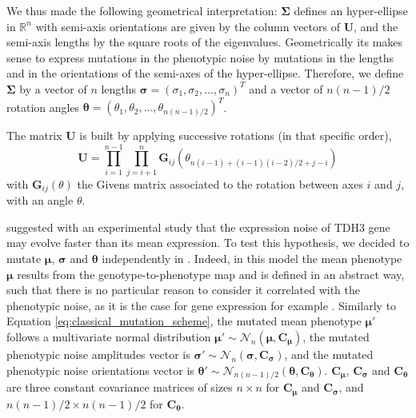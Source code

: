 We thus made the following geometrical interpretation: 
$\boldsymbol{\Sigma}$ defines an hyper-ellipse in $\mathbb{R}^n$ with semi-axis orientations are given by the column vectors of $\boldsymbol{U}$, and the semi-axis lengths by the square roots of the eigenvalues. Geometrically its makes sense to express mutations in the phenotypic noise by mutations in the lengths and in the orientations of the semi-axes of the hyper-ellipse.
Therefore, we define $\boldsymbol{\Sigma}$ by a vector of $n$ lengths $\boldsymbol{\sigma} = (\sigma_1,\sigma_2,...,\sigma_n)^T$ and a vector of $n(n-1)/2$ rotation angles $\boldsymbol{\theta} = (\theta_1,\theta_2,...,\theta_{n(n-1)/2})^T$.

The matrix $\boldsymbol{U}$ is built by applying successive rotations (in that specific order),
\begin{equation}
\boldsymbol{U} = \prod_{i=1}^{n-1} \prod_{j=i+1}^{n} \boldsymbol{G}_{ij}(\theta_{n(i-1)+(i-1)(i-2)/2+j-i})
\label{eq:rotations_order}
\end{equation}
with $\boldsymbol{G}_{ij}(\theta)$ the Givens matrix associated to the rotation between axes $i$ and $j$, with an angle $\theta$.

\cite{metzger-et-al-2015} suggested with an experimental study that the expression noise of TDH3 gene may evolve faster than its mean expression. To test this hypothesis, we decided to mutate $\boldsymbol{\mu}$, $\boldsymbol{\sigma}$ and $\boldsymbol{\theta}$ independently in {\sigmaFGM}. Indeed, in this model the mean phenotype $\boldsymbol{\mu}$ results from the genotype-to-phenotype map and is defined in an abstract way, such that there is no particular reason to consider it correlated with the phenotypic noise, as it is the case for gene expression for example \citep{ozbudak-et-al-2002}.
Similarly to Equation \ref{eq:classical_mutation_scheme}, the mutated mean phenotype $\boldsymbol{\mu}'$ follows a multivariate normal distribution $\boldsymbol{\mu}' \sim \mathcal{N}_n(\boldsymbol{\mu}, \boldsymbol{C_\mu})$, the mutated phenotypic noise amplitudes vector is $\boldsymbol{\sigma}' \sim \mathcal{N}_n(\boldsymbol{\sigma}, \boldsymbol{C_\sigma})$, and the mutated phenotypic noise orientations vector is $\boldsymbol{\theta}' \sim \mathcal{N}_{n(n-1)/2}(\boldsymbol{\theta}, \boldsymbol{C_\theta})$.
$\boldsymbol{C_\mu}$, $\boldsymbol{C_\sigma}$ and $\boldsymbol{C_\theta}$ are three constant covariance matrices of sizes $n \times n$ for $\boldsymbol{C_\mu}$ and $\boldsymbol{C_\sigma}$, and $n(n-1)/2 \times n(n-1)/2$ for $\boldsymbol{C_\theta}$.

